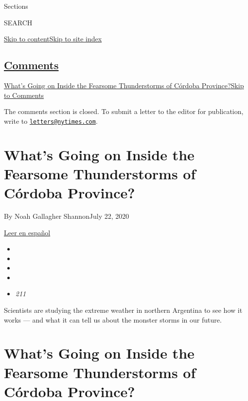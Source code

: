 Sections

SEARCH

\protect\hyperlink{site-content}{Skip to
content}\protect\hyperlink{site-index}{Skip to site index}

\hypertarget{comments}{%
\subsection{\texorpdfstring{\protect\hyperlink{commentsContainer}{Comments}}{Comments}}\label{comments}}

\href{}{What's Going on Inside the Fearsome Thunderstorms of Córdoba
Province?}\href{}{Skip to Comments}

The comments section is closed. To submit a letter to the editor for
publication, write to
\href{mailto:letters@nytimes.com}{\nolinkurl{letters@nytimes.com}}.

\hypertarget{whats-going-on-inside-the-fearsome-thunderstorms-of-cuxf3rdoba-province}{%
\section{What's Going on Inside the Fearsome Thunderstorms of Córdoba
Province?}\label{whats-going-on-inside-the-fearsome-thunderstorms-of-cuxf3rdoba-province}}

By Noah Gallagher ShannonJuly 22, 2020

\href{https://www.nytimes.com/es/interactive/2020/07/23/espanol/ciencia-y-tecnologia/cordoba-tormentas-argentina.html}{Leer
en español}

\begin{itemize}
\item
\item
\item
\item
\item
  \emph{211}
\end{itemize}

Scientists are studying the extreme weather in northern Argentina to see
how it works --- and what it can tell us about the monster storms in our
future.

\hypertarget{whats-going-on-inside-the-fearsome-thunderstorms-of-cuxf3rdoba-province-1}{%
\section{What's Going on Inside the Fearsome Thunderstorms of Córdoba
Province?}\label{whats-going-on-inside-the-fearsome-thunderstorms-of-cuxf3rdoba-province-1}}

